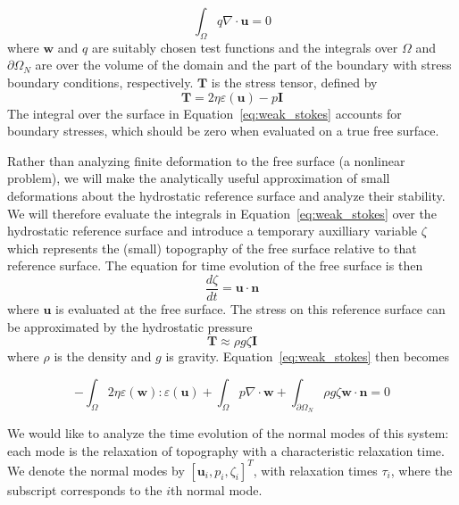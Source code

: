 \documentclass[preprint,12pt,authoryear]{elsarticle}
\begin{document}
\begin{equation}
\int_\Omega q \nabla \cdot \mathbf{u} = 0
\label{eq:weak_incompressible}
\end{equation}
where $\mathbf{w}$ and $q$ are suitably chosen test functions and the integrals over 
$\Omega$ and $\partial \Omega_N$ are over the volume of the domain and the part of the boundary with stress boundary conditions, respectively.
$\mathbf{T}$ is the stress tensor, defined by
\begin{equation}
\mathbf{T} = 2 \eta \varepsilon(\mathbf{u}) - p \mathbf{I}
\end{equation}
The integral over the surface in Equation~\eqref{eq:weak_stokes} accounts for boundary stresses, 
which should be zero when evaluated on a true free surface.

Rather than analyzing finite deformation to the free surface (a nonlinear problem),
we will make the analytically useful approximation of small deformations about the hydrostatic 
reference surface and analyze their stability.
We will therefore  evaluate the integrals in Equation~\eqref{eq:weak_stokes} 
over the hydrostatic reference surface and introduce a temporary auxilliary variable $\zeta$ which 
represents the (small) topography of the free surface relative to that reference surface.
The equation for time evolution of the free surface is then
\begin{equation}
\frac{d \zeta}{dt} = \mathbf{u \cdot n}
\label{eq:surface_evolution}
\end{equation}
where $\mathbf{u}$ is evaluated at the free surface.
The stress on this reference surface can be approximated by the hydrostatic pressure
\begin{equation}
\mathbf{T} \approx \rho g \zeta \mathbf{I}
\label{eq:hydrostatic}
\end{equation}
where $\rho$ is the density and $g$ is gravity. Equation~\eqref{eq:weak_stokes} then becomes

\begin{equation}
-\int_\Omega 2 \eta \varepsilon( \mathbf{w} ) \colon \varepsilon( \mathbf{u} ) + \int_\Omega p \nabla \cdot \mathbf{w} 
+ \int_{\partial \Omega_N} \rho g \zeta  \mathbf{w} \cdot \mathbf{n} = 0 
\end{equation}

We would like to analyze the time evolution of the normal modes of this system: each mode 
is the relaxation of topography with a characteristic relaxation time.  
We denote the normal modes by $\left[ \mathbf{u}_i, p_i, \zeta_i \right]^T$, with
relaxation times $\tau_i$, where the subscript corresponds to the $i$th normal mode.
\end{document}
